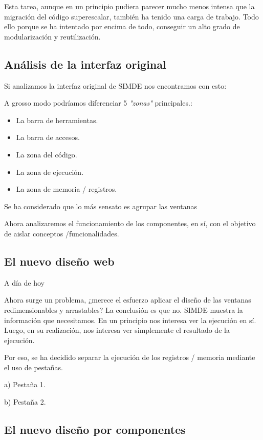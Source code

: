 Esta tarea, aunque en un principio pudiera parecer mucho menos intensa que la migración del código 
superescalar, también ha tenido una carga de trabajo. Todo ello porque se ha intentado por encima 
de todo, conseguir un alto grado de modularización y reutilización. 

\subsection{Análisis de la interfaz original}

Si analizamos la interfaz original de SIMDE nos encontramos con esto: 

A grosso modo podríamos diferenciar 5 \textit{"zonas"} principales.:

\begin{itemize}

\item La barra de herramientas.

\item La barra de accesos.

\item La zona del código.

\item La zona de ejecución.

\item La zona de memoria / registros. 

\end{itemize}

Se ha considerado que lo más sensato es agrupar las ventanas 

Ahora analizaremos el funcionamiento de los componentes, en sí, con el objetivo de aislar conceptos
/funcionalidades.

\subsection{El nuevo diseño web}

A día de hoy 

\bigskip
Ahora surge un problema, ¿merece el esfuerzo aplicar el diseño de las ventanas redimensionables y 
arrastables? La conclusión es que no. SIMDE muestra la información que necesitamos. En un 
principio nos interesa ver la ejecución en sí. Luego, en su realización, nos interesa ver simplemente
el resultado de la ejecución.

\bigskip
Por eso, se ha decidido separar la ejecución de los registros / memoria mediante el uso de pestañas.

a) Pestaña 1.

b) Pestaña 2.

\subsection{El nuevo diseño por componentes}